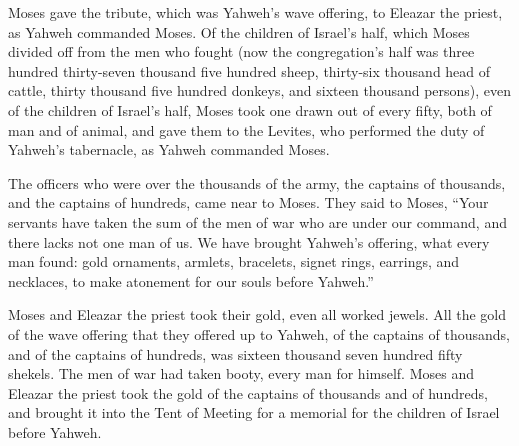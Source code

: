 {Moses gave the tribute, which was Yahweh’s wave offering, to Eleazar the priest, as Yahweh commanded Moses.
Of the children of Israel’s half, which Moses divided off from the men who fought
(now the congregation’s half was three hundred thirty-seven thousand five hundred sheep,
thirty-six thousand head of cattle,
thirty thousand five hundred donkeys,
and sixteen thousand persons),
even of the children of Israel’s half, Moses took one drawn out of every fifty, both of man and of animal, and gave them to the Levites, who performed the duty of Yahweh’s tabernacle, as Yahweh commanded Moses.
\par }{\PP {}The officers who were over the thousands of the army, the captains of thousands, and the captains of hundreds, came near to Moses.
They said to Moses, “Your servants have taken the sum of the men of war who are under our command, and there lacks not one man of us.
We have brought Yahweh’s offering, what every man found: gold ornaments, armlets, bracelets, signet rings, earrings, and necklaces, to make atonement for our souls before Yahweh.”
\par }{\PP {}Moses and Eleazar the priest took their gold, even all worked jewels.
All the gold of the wave offering that they offered up to Yahweh, of the captains of thousands, and of the captains of hundreds, was sixteen thousand seven hundred fifty shekels.
The men of war had taken booty, every man for himself.
Moses and Eleazar the priest took the gold of the captains of thousands and of hundreds, and brought it into the Tent of Meeting for a memorial for the children of Israel before Yahweh.

}
